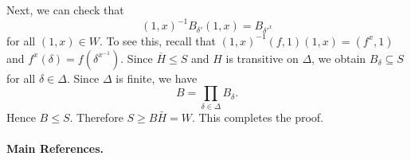 \begin{sketch}
Next, we can check that $$(1,x)^{-1}B_{\delta'} (1,x) = B_{\delta'^{x}}$$ for all $(1,x)\in W$. To see this, recall that $(1,x)^{-1}(f,1)(1,x) = (f^x,1)$ and $f^x(\delta) = f(\delta^{x^{-1}})$. Since $\overline{H}\leq S$ and $H$ is transitive on $\Delta$, we obtain $B_{\delta}\subseteq S$ for all $\delta\in \Delta$. Since $\Delta$ is finite, we have $$B = \prod_{\delta\in\Delta} B_{\delta}.$$ Hence $B\leq S$. Therefore $S\geq B\bar{H} = W$. This completes the proof.
\end{sketch}

\paragraph{Main References.} \cite{Meldrum1995,Praeger2018,Dixon1996}
